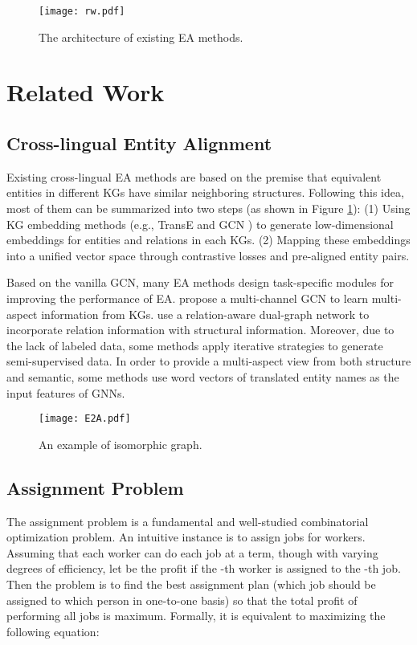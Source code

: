\documentclass[11pt]{article}
\begin{document}
\begin{figure}
  \centering
  \texttt{[image: rw.pdf]}
  \caption{The architecture of existing EA methods.}\label{fig:rw}
\end{figure}

\section{Related Work}
\subsection{Cross-lingual Entity Alignment}
Existing cross-lingual EA methods are based on the premise that equivalent entities in different KGs have similar neighboring structures.
Following this idea, most of them can be summarized into two steps (as shown in Figure \ref{fig:rw}):
(1) Using KG embedding methods (e.g., TransE \cite{DBLP:conf/nips/BordesUGWY13} and GCN \cite{DBLP:journals/corr/KipfW16}) to generate low-dimensional embeddings for entities and relations in each KGs.
(2) Mapping these embeddings into a unified vector space through contrastive losses \cite{DBLP:conf/cvpr/HadsellCL06,DBLP:conf/cvpr/SchroffKP15} and pre-aligned entity pairs.

Based on the vanilla GCN, many EA methods design task-specific modules for improving the performance of EA.
\citet{DBLP:conf/acl/CaoLLLLC19} propose a multi-channel GCN to learn multi-aspect information from KGs.
\citet{DBLP:conf/ijcai/WuLF0Y019} use a relation-aware dual-graph network to incorporate relation information with structural information.
Moreover, due to the lack of labeled data, some methods \cite{DBLP:conf/ijcai/SunHZQ18,DBLP:conf/wsdm/MaoWXLW20} apply iterative strategies to generate semi-supervised data.
In order to provide a multi-aspect view from both structure and semantic, some methods \cite{DBLP:conf/emnlp/WuLFWZ19,DBLP:conf/emnlp/YangZSLLS19} use word vectors of translated entity names as the input features of GNNs.

\begin{figure}
  \centering
  \texttt{[image: E2A.pdf]}
  \caption{An example of isomorphic graph.}\label{fig:E-A}
\end{figure}

\subsection{Assignment Problem}
\label{rw:ap}
The assignment problem is a fundamental and well-studied combinatorial optimization problem.
An intuitive instance is to assign  jobs for  workers.
Assuming that each worker can do each job at a term, though with varying degrees of efficiency, let  be the profit if the -th worker is assigned to the -th job.
Then the problem is to find the best assignment plan (which job should be assigned to which person in one-to-one basis) so that the total profit of performing all jobs is maximum.
Formally, it is equivalent to maximizing the following equation:
\end{document}
